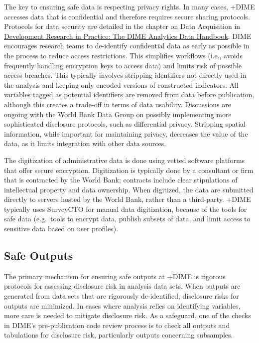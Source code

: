 \documentclass[
]{book}
\begin{document}
The key to ensuring safe data is respecting privacy rights. In many cases, +DIME\textbar{} accesses data that is confidential and therefore requires secure sharing protocols. Protocols for data security are detailed in the chapter on Data Acquisition in \href{https://worldbank.github.io/dime-data-handbook/}{Development Research in Practice: The DIME Analytics Data Handbook}. DIME encourages research teams to de-identify confidential data as early as possible in the process to reduce access restrictions. This simplifies workflows (i.e., avoids frequently handling encryption keys to access data) and limits risk of possible access breaches. This typically involves stripping identifiers not directly used in the analysis and keeping only encoded versions of constructed indicators. All variables tagged as potential identifiers are removed from data before publication, although this creates a trade-off in terms of data usability. Discussions are ongoing with the World Bank Data Group on possibly implementing more sophisticated disclosure protocols, such as differential privacy. Stripping spatial information, while important for maintaining privacy, decreases the value of the data, as it limits integration with other data sources.

The digitization of administrative data is done using vetted software platforms that offer secure encryption. Digitization is typically done by a consultant or firm that is contracted by the World Bank; contracts include clear stipulations of intellectual property and data ownership. When digitized, the data are submitted directly to servers hosted by the World Bank, rather than a third-party. +DIME\textbar{} typically uses SurveyCTO for manual data digitization, because of the tools for safe data (e.g.~tools to encrypt data, publish subsets of data, and limit access to sensitive data based on user profiles).

\hypertarget{safe-outputs-7}{%
\subsection{Safe Outputs}\label{safe-outputs-7}}

The primary mechanism for ensuring safe outputs at +DIME\textbar{} is rigorous protocols for assessing disclosure risk in analysis data sets. When outputs are generated from data sets that are rigorously de-identified, disclosure risks for outputs are minimized. In cases where analysis relies on identifying variables, more care is needed to mitigate disclosure risk. As a safeguard, one of the checks in DIME's pre-publication code review process is to check all outputs and tabulations for disclosure risk, particularly outputs concerning subsamples.
\end{document}
